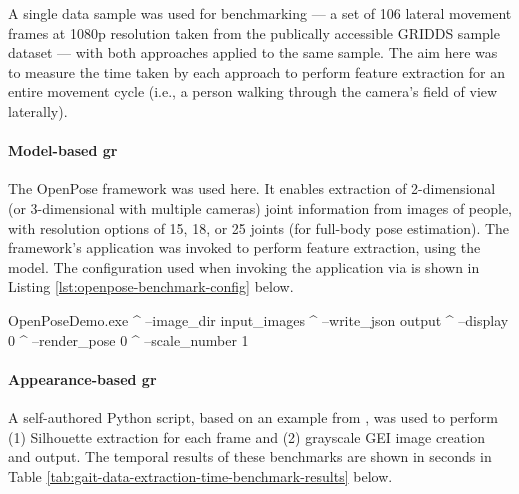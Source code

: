 A single data sample was used for benchmarking --- a set of 106 lateral movement frames at 1080p resolution taken from the publically accessible GRIDDS sample dataset \parencite{nunesGRIDDSGaitRecognition2019} --- with both approaches applied to the same sample.
The aim here was to measure the time taken by each approach to perform feature extraction for an entire movement cycle (i.e., a person walking through the camera's field of view laterally).

\paragraph{Model-based \ac{gr}} The OpenPose framework was used here. It enables extraction of 2-dimensional (or 3-dimensional with multiple cameras) joint information from images of people, with resolution options of 15, 18, or 25 joints (for full-body pose estimation).
The framework's  application was invoked to perform feature extraction, using the  model.
The configuration used when invoking the application via  is shown in Listing \ref{lst:openpose-benchmark-config} below.

\begin{code}[minted language=bash]
OpenPoseDemo.exe ^
    --image_dir input_images ^
    --write_json output ^
    --display 0 ^
    --render_pose 0 ^
    --scale_number 1
\end{code}
\label{lst:openpose-benchmark-config} \vspace{10pt}

\paragraph{Appearance-based \ac{gr}} A self-authored Python script, based on an example from \cite{songDevelopfengGaitRecognition2024}, was used to perform
(1) Silhouette extraction for each frame and
(2) grayscale GEI image creation and output.
The temporal results of these benchmarks are shown in seconds in Table \ref{tab:gait-data-extraction-time-benchmark-results} below.

